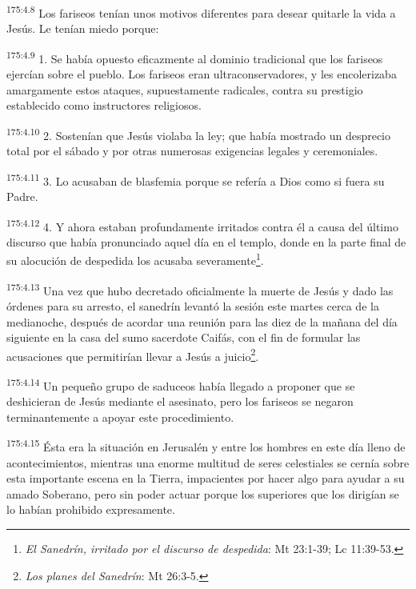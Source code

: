 \par
\textsuperscript{175:4.8} Los fariseos tenían unos motivos diferentes para desear quitarle la vida a Jesús. Le tenían miedo porque:

\par
\textsuperscript{175:4.9} 1. Se había opuesto eficazmente al dominio tradicional que los fariseos ejercían sobre el pueblo. Los fariseos eran ultraconservadores, y les encolerizaba amargamente estos ataques, supuestamente radicales, contra su prestigio establecido como instructores religiosos.

\par
\textsuperscript{175:4.10} 2. Sostenían que Jesús violaba la ley; que había mostrado un desprecio total por el sábado y por otras numerosas exigencias legales y ceremoniales.

\par
\textsuperscript{175:4.11} 3. Lo acusaban de blasfemia porque se refería a Dios como si fuera su Padre.

\par
\textsuperscript{175:4.12} 4. Y ahora estaban profundamente irritados contra él a causa del último discurso que había pronunciado aquel día en el templo, donde en la parte final de su alocución de despedida los acusaba severamente\footnote{\textit{El Sanedrín, irritado por el discurso de despedida}: Mt 23:1-39; Lc 11:39-53.}.

\par
\textsuperscript{175:4.13} Una vez que hubo decretado oficialmente la muerte de Jesús y dado las órdenes para su arresto, el sanedrín levantó la sesión este martes cerca de la medianoche, después de acordar una reunión para las diez de la mañana del día siguiente en la casa del sumo sacerdote Caifás, con el fin de formular las acusaciones que permitirían llevar a Jesús a juicio\footnote{\textit{Los planes del Sanedrín}: Mt 26:3-5.}.

\par
\textsuperscript{175:4.14} Un pequeño grupo de saduceos había llegado a proponer que se deshicieran de Jesús mediante el asesinato, pero los fariseos se negaron terminantemente a apoyar este procedimiento.

\par
\textsuperscript{175:4.15} Ésta era la situación en Jerusalén y entre los hombres en este día lleno de acontecimientos, mientras una enorme multitud de seres celestiales se cernía sobre esta importante escena en la Tierra, impacientes por hacer algo para ayudar a su amado Soberano, pero sin poder actuar porque los superiores que los dirigían se lo habían prohibido expresamente.